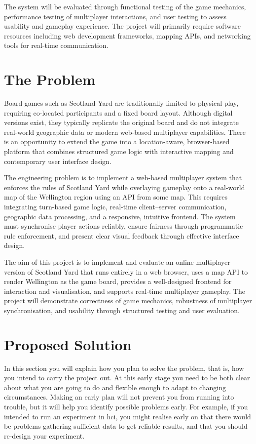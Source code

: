\documentclass[11pt, a4paper, twoside, openright]{article}
\begin{document}
	The system will be evaluated through functional testing of the game mechanics, performance testing of multiplayer interactions, and user testing to assess usability and gameplay experience. The project will primarily require software resources including web development frameworks, mapping APIs, and networking tools for real-time communication.

	
	\section{The Problem}
	
	Board games such as Scotland Yard are traditionally limited to physical play, requiring co-located participants and a fixed board layout. Although digital versions exist, they typically replicate the original board and do not integrate real-world geographic data or modern web-based multiplayer capabilities. There is an opportunity to extend the game into a location-aware, browser-based platform that combines structured game logic with interactive mapping and contemporary user interface design.

	The engineering problem is to implement a web-based multiplayer system that enforces the rules of Scotland Yard while overlaying gameplay onto a real-world map of the Wellington region using an API from some map. This requires integrating turn-based game logic, real-time client–server communication, geographic data processing, and a responsive, intuitive frontend. The system must synchronise player actions reliably, ensure fairness through programmatic rule enforcement, and present clear visual feedback through effective interface design.
	
	The aim of this project is to implement and evaluate an online multiplayer version of Scotland Yard that runs entirely in a web browser, uses a map API to render Wellington as the game board, provides a well-designed frontend for interaction and visualisation, and supports real-time multiplayer gameplay. The project will demonstrate correctness of game mechanics, robustness of multiplayer synchronisation, and usability through structured testing and user evaluation.
	
	\section{Proposed Solution}
	
	In this section you will explain how you plan to solve the problem, that is, how you intend to carry the project out. At this early stage you need to be both clear about what you are going to do and flexible enough to adapt to changing circumstances. Making an early plan will not prevent you from running into trouble, but it will help you identify possible problems early. For example, if you intended to run an experiment in \gls{hci}, you might realise early on that there would be problems gathering sufficient data to get reliable results, and that you should re-design your experiment.
	
\end{document}
